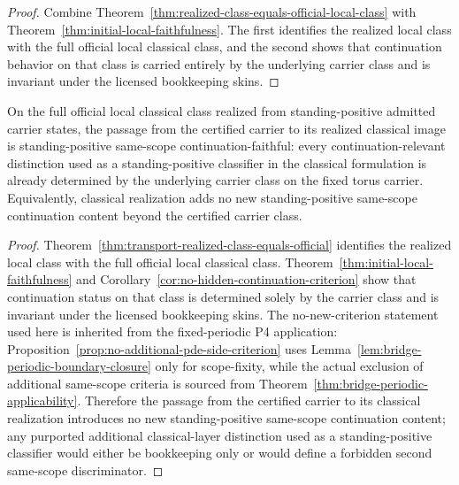 \begin{proof}
Combine Theorem~\ref{thm:realized-class-equals-official-local-class} with
Theorem~\ref{thm:initial-local-faithfulness}. The first identifies the realized local class with the
full official local classical class, and the second shows that continuation behavior on that class is
carried entirely by the underlying carrier class and is invariant under the licensed bookkeeping
skins.
\end{proof}

\begin{manualtheorem}
\label{thm:transfer-no-new-content}
On the full official local classical class realized from standing-positive admitted carrier states, the passage from the certified carrier to its realized classical image is standing-positive same-scope continuation-faithful: every continuation-relevant distinction used as a standing-positive classifier in the classical formulation is already determined by the underlying carrier class on the fixed torus carrier. Equivalently, classical realization adds no new standing-positive same-scope continuation content beyond the certified carrier class.
\end{manualtheorem}

\begin{proof}
Theorem~\ref{thm:transport-realized-class-equals-official} identifies the realized local class with the full official local classical class. Theorem~\ref{thm:initial-local-faithfulness} and Corollary~\ref{cor:no-hidden-continuation-criterion} show that continuation status on that class is determined solely by the carrier class and is invariant under the licensed bookkeeping skins. The no-new-criterion statement used here is inherited from the fixed-periodic P4 application: Proposition~\ref{prop:no-additional-pde-side-criterion} uses Lemma~\ref{lem:bridge-periodic-boundary-closure} only for scope-fixity, while the actual exclusion of additional same-scope criteria is sourced from Theorem~\ref{thm:bridge-periodic-applicability}. Therefore the passage from the certified carrier to its classical realization introduces no new standing-positive same-scope continuation content; any purported additional classical-layer distinction used as a standing-positive classifier would either be bookkeeping only or would define a forbidden second same-scope discriminator.
\end{proof}

